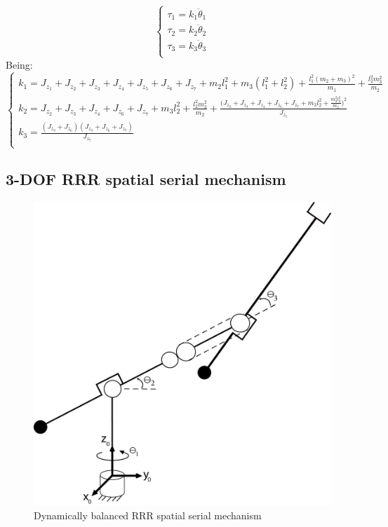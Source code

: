 \documentclass[a4paper,11pt,brazil,fleqn]{article}
\begin{document}
\begin{equation}\label{eq:DynamicBalanced1}
\begin{cases}
\tau_1 = k_1 \ddot{\theta}_1 \\
\tau_2 = k_2 \ddot{\theta}_2 \\
\tau_3 = k_3 \ddot{\theta}_3 \\
\end{cases}
\end{equation}
Being:
\begin{equation}\label{eq:DynamicBalancedKs1}
\begin{cases}
k_1 = J_{z_1} + J_{z_2} + J_{z_3} + J_{z_4} + J_{z_5} + J_{z_6} + J_{z_7} + m_2 l_1^2 + m_3 (l_1^2 + l_2^2) + \frac{l_1^2 (m_2 + m_3)^2}{m_1} + \frac{l_2^2 m_3^2}{m_2} \\
k_2 = J_{z_2} + J_{z_3} + J_{z_4} + J_{z_6} + J_{z_7} + m_3 l_2^2 + \frac{l_2^2 m_3^2}{m_2} + \frac{\big(J_{z_2} + J_{z_3} + J_{z_4} + J_{z_6} + J_{z_7} + m_3 l_2^2 + \frac{m_3^2 l_2^2}{m_2}\big)^2}{J_{z_5}} \\
k_3 = \frac{(J_{z_3}+J_{z_6})(J_{z_3}+J_{z_6}+J_{z_7})}{J_{z_7}} \\
\end{cases}
\end{equation}

\subsection{3-DOF RRR spatial serial mechanism} \label{S03-2}

\begin{figure}[H]
	\centering
	\includegraphics[scale=0.11]{RRR3D.jpg}  
	\caption{Dynamically balanced RRR spatial serial mechanism}
	\label{fig:RRR3D}
\end{figure}
\end{document}
